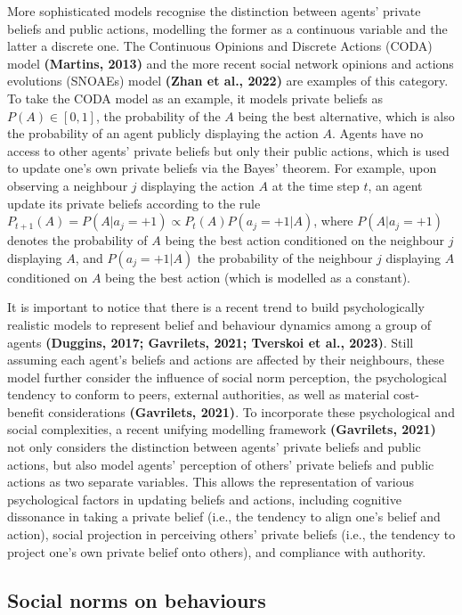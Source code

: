 \documentclass[
  11pt,
]{article}
\begin{document}
More sophisticated models recognise the distinction between agents'
private beliefs and public actions, modelling the former as a continuous
variable and the latter a discrete one. The Continuous Opinions and
Discrete Actions (CODA) model \textbf{(Martins, 2013)} and the more
recent social network opinions and actions evolutions (SNOAEs) model
\textbf{(Zhan et al., 2022)} are examples of this category. To take the
CODA model as an example, it models private beliefs as
\(P(A) \in [0,1]\), the probability of the \(A\) being the best
alternative, which is also the probability of an agent publicly
displaying the action \(A\). Agents have no access to other agents'
private beliefs but only their public actions, which is used to update
one's own private beliefs via the Bayes' theorem. For example, upon
observing a neighbour \(j\) displaying the action \(A\) at the time step
\(t\), an agent update its private beliefs according to the rule
\(P_{t+1}(A) = P(A | a_j = +1) \propto P_t(A) P(a_j = +1 | A)\), where
\(P(A | a_j = +1)\) denotes the probability of \(A\) being the best
action conditioned on the neighbour \(j\) displaying \(A\), and
\(P(a_j = +1 | A)\) the probability of the neighbour \(j\) displaying
\(A\) conditioned on \(A\) being the best action (which is modelled as a
constant).

It is important to notice that there is a recent trend to build
psychologically realistic models to represent belief and behaviour
dynamics among a group of agents \textbf{(Duggins, 2017; Gavrilets,
2021; Tverskoi et al., 2023)}. Still assuming each agent's beliefs and
actions are affected by their neighbours, these model further consider
the influence of social norm perception, the psychological tendency to
conform to peers, external authorities, as well as material cost-benefit
considerations \textbf{(Gavrilets, 2021)}. To incorporate these
psychological and social complexities, a recent unifying modelling
framework \textbf{(Gavrilets, 2021)} not only considers the distinction
between agents' private beliefs and public actions, but also model
agents' perception of others' private beliefs and public actions as two
separate variables. This allows the representation of various
psychological factors in updating beliefs and actions, including
cognitive dissonance in taking a private belief (i.e., the tendency to
align one's belief and action), social projection in perceiving others'
private beliefs (i.e., the tendency to project one's own private belief
onto others), and compliance with authority.

\hypertarget{social-norms-on-behaviours}{%
\subsection{Social norms on
behaviours}\label{social-norms-on-behaviours}}
\end{document}
